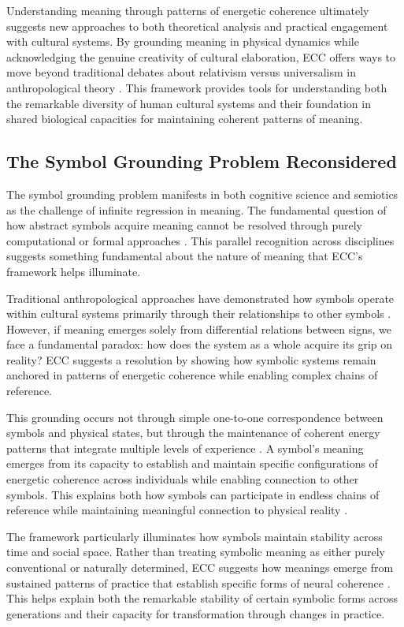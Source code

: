Understanding meaning through patterns of energetic coherence ultimately suggests new approaches to both theoretical analysis and practical engagement with cultural systems. By grounding meaning in physical dynamics while acknowledging the genuine creativity of cultural elaboration, ECC offers ways to move beyond traditional debates about relativism versus universalism in anthropological theory \cite{wolf1999envisioning}. This framework provides tools for understanding both the remarkable diversity of human cultural systems and their foundation in shared biological capacities for maintaining coherent patterns of meaning.

\subsection{The Symbol Grounding Problem Reconsidered}

The symbol grounding problem manifests in both cognitive science and semiotics as the challenge of infinite regression in meaning. The fundamental question of how abstract symbols acquire meaning cannot be resolved through purely computational or formal approaches \cite{harnad1990symbol}. This parallel recognition across disciplines suggests something fundamental about the nature of meaning that ECC's framework helps illuminate.

Traditional anthropological approaches have demonstrated how symbols operate within cultural systems primarily through their relationships to other symbols \cite{saussure1983course}. However, if meaning emerges solely from differential relations between signs, we face a fundamental paradox: how does the system as a whole acquire its grip on reality? ECC suggests a resolution by showing how symbolic systems remain anchored in patterns of energetic coherence while enabling complex chains of reference.

This grounding occurs not through simple one-to-one correspondence between symbols and physical states, but through the maintenance of coherent energy patterns that integrate multiple levels of experience \cite{lakoff1999philosophy}. A symbol's meaning emerges from its capacity to establish and maintain specific configurations of energetic coherence across individuals while enabling connection to other symbols. This explains both how symbols can participate in endless chains of reference while maintaining meaningful connection to physical reality \cite{peirce1931collected}.

The framework particularly illuminates how symbols maintain stability across time and social space. Rather than treating symbolic meaning as either purely conventional or naturally determined, ECC suggests how meanings emerge from sustained patterns of practice that establish specific forms of neural coherence \cite{barsalou1999perceptual}. This helps explain both the remarkable stability of certain symbolic forms across generations and their capacity for transformation through changes in practice.

